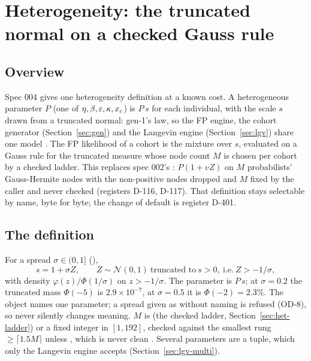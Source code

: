 \section{Heterogeneity: the truncated normal on a checked Gauss rule}\label{sec:het}

\subsection{Overview}\label{sec:het-overview}

Spec 004 gives  one heterogeneity definition at a known cost. A heterogeneous parameter $P$ (one of
$\eta,\beta,\varepsilon,\kappa,x_c$) is $P\,s$ for each individual, with the scale $s$ drawn from a truncated normal: gen-1's
law, so the FP engine, the cohort generator (Section~\ref{sec:gen}) and the Langevin engine
(Section~\ref{sec:lgv}) share one model . The FP likelihood of a cohort is the
mixture over $s$, evaluated on a Gauss rule for the truncated measure whose node count $M$ is chosen per cohort by a
checked ladder. This replaces spec 002's : $P(1+vZ)$ on $M$ probabilists' Gauss-Hermite nodes
with the non-positive nodes dropped and $M$ fixed by the caller and never checked (registers D-116, D-117). That
definition stays selectable by name, byte for byte; the change of default is register D-401.

\subsection{The definition}\label{sec:het-def}

For a spread $\sigma\in(0,1]$ (),
\begin{equation}\label{eq:het-tn}
  s = 1+\sigma Z,\qquad Z\sim\mathcal N(0,1)\ \text{truncated to}\ s>0,\ \text{i.e.}\ Z>-1/\sigma,
\end{equation}
with density $\varphi(z)/\Phi(1/\sigma)$ on $z>-1/\sigma$. The parameter is $P\,s$; at $\sigma=0.2$ the truncated
mass $\Phi(-5)$ is $2.9\times10^{-7}$, at $\sigma=0.5$ it is $\Phi(-2)=2.3\%$. The object
 names one parameter; a spread given as  without
naming  is refused (OD-8), so  never silently changes meaning. $M$ is
 (the checked ladder, Section~\ref{sec:het-ladder}) or a fixed integer in $[1,192]$, checked against the
smallest rung $\ge\lceil1.5M\rceil$ unless , which is never clean
. Several parameters are
a tuple, which only the Langevin engine accepts (Section~\ref{sec:lgv-multi}).

